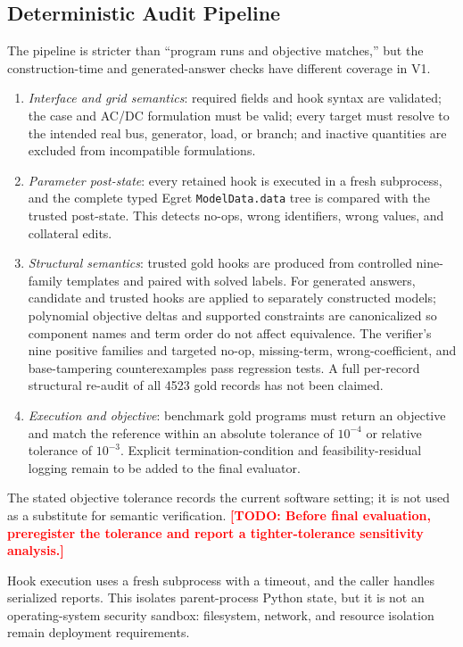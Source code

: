 \documentclass[lettersize,journal]{IEEEtran}
\newcommand{\drafttodo}[1]{\textcolor{red}{\textbf{[TODO: #1]}}}
\begin{document}
\subsection{Deterministic Audit Pipeline}
The pipeline is stricter than ``program runs and objective matches,'' but the construction-time and generated-answer checks have different coverage in V1.
\begin{enumerate}
  \item \emph{Interface and grid semantics}: required fields and hook syntax are validated; the case and AC/DC formulation must be valid; every target must resolve to the intended real bus, generator, load, or branch; and inactive quantities are excluded from incompatible formulations.
  \item \emph{Parameter post-state}: every retained hook is executed in a fresh subprocess, and the complete typed Egret \texttt{ModelData.data} tree is compared with the trusted post-state. This detects no-ops, wrong identifiers, wrong values, and collateral edits.
  \item \emph{Structural semantics}: trusted gold hooks are produced from controlled nine-family templates and paired with solved labels. For generated answers, candidate and trusted hooks are applied to separately constructed models; polynomial objective deltas and supported constraints are canonicalized so component names and term order do not affect equivalence. The verifier's nine positive families and targeted no-op, missing-term, wrong-coefficient, and base-tampering counterexamples pass regression tests. A full per-record structural re-audit of all 4523 gold records has not been claimed.
  \item \emph{Execution and objective}: benchmark gold programs must return an objective and match the reference within an absolute tolerance of $10^{-4}$ or relative tolerance of $10^{-3}$. Explicit termination-condition and feasibility-residual logging remain to be added to the final evaluator.
\end{enumerate}

The stated objective tolerance records the current software setting; it is not used as a substitute for semantic verification. \drafttodo{Before final evaluation, preregister the tolerance and report a tighter-tolerance sensitivity analysis.}

Hook execution uses a fresh subprocess with a timeout, and the caller handles serialized reports. This isolates parent-process Python state, but it is not an operating-system security sandbox: filesystem, network, and resource isolation remain deployment requirements.
\end{document}
